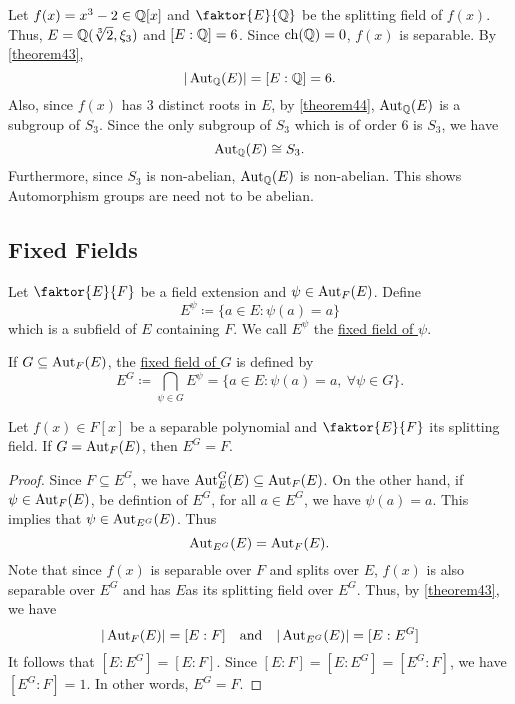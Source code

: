 \documentclass[11pt]{article}
\newcommand{\quotient}[2]{\faktor{#1}{#2}}
\DeclareMathOperator{\ch}{ch}
\begin{document}
\begin{example}
Let $f(x) = x^3 -2 \in \mathbb{Q}[x]$ and $\quotient{E}{\Q}$ be the splitting field of
$f(x)$. Thus, $E = \mathbb{Q}(\sqrt[3]2, \xi_3)$ and $[E:\mathbb{Q}] = 6$. Since $\ch(\Q) = 0$,
$f(x)$ is separable. By \cref{theorem43},
\begin{equation*}
|\operatorname{Aut}_{\mathbb{Q}}(E)| = [E:\mathbb{Q}] = 6.
\end{equation*}
Also, since $f(x)$ has 3 distinct roots in $E$, by \cref{theorem44},
$\operatorname{Aut}_{\mathbb{Q}}(E)$ is a subgroup of $S_3$. Since the only subgroup of $S_3$ which is
of order 6 is $S_3$, we have
\begin{equation*}
\operatorname{Aut}_{\mathbb{Q}}(E) \cong S_3.
\end{equation*}
Furthermore, since $S_3$ is non-abelian, $\operatorname{Aut}_{\mathbb{Q}}(E)$ is non-abelian. This shows
Automorphism groups are need not to be abelian.
\end{example}

\subsection{Fixed Fields}
\begin{definition}
Let $\quotient{E}{F}$ be a field extension and $\psi \in \operatorname{Aut}_F(E)$. Define
\begin{equation*}
E^\psi \coloneqq \{ a \in E: \psi(a) = a\}
\end{equation*}
which is a subfield of $E$ containing $F$. We call $E^\psi$ the
\underline{fixed field of $\psi$}.
\end{definition}
\begin{definition}
If $G \subseteq \operatorname{Aut}_F(E)$, the \underline{fixed field of $G$} is defined by
\begin{equation*}
E^G \coloneqq \bigcap_{\psi \in G}E^\psi = \{ a \in E:\psi(a) = a,\>\forall \psi
\in G\}.
\end{equation*}
\end{definition}
\begin{theorem}
Let $f(x) \in F[x]$ be a separable polynomial and $\quotient{E}{F}$ its
splitting field. If $G =\operatorname{Aut}_F(E)$, then $E^G = F$.
\label{theorem45}
\end{theorem}
\begin{proof}
Since $F \subseteq E^G$, we have $\operatorname{Aut}_E^G(E) \subseteq \operatorname{Aut}_F(E)$. On the other
hand, if $\psi \in \operatorname{Aut}_F(E)$, be defintion of $E^G$, for all $a \in E^G$, we
have $\psi(a) = a$. This implies that $\psi \in \operatorname{Aut}_{E^G}(E)$. Thus
\begin{equation*}
\operatorname{Aut}_{E^G}(E) = \operatorname{Aut}_F(E).
\end{equation*}
Note that since $f(x)$ is separable over $F$ and splits over $E$, $f(x)$ is also
separable over $E^G$ and has $E$as its splitting field over $E^G$. Thus, by
\cref{theorem43}, we have
\begin{equation*}
|\operatorname{Aut}_F(E)| = [E:F] \quad\text{and}\quad |\operatorname{Aut}_{E^G}(E)| = [E:E^G] 
\end{equation*}
It follows that $[E:E^G] = [E:F]$. Since $[E:F]=[E:E^G]=[E^G:F]$, we have
$[E^G:F] = 1$. In other words, $E^G = F$.
\end{proof}
\end{document}

